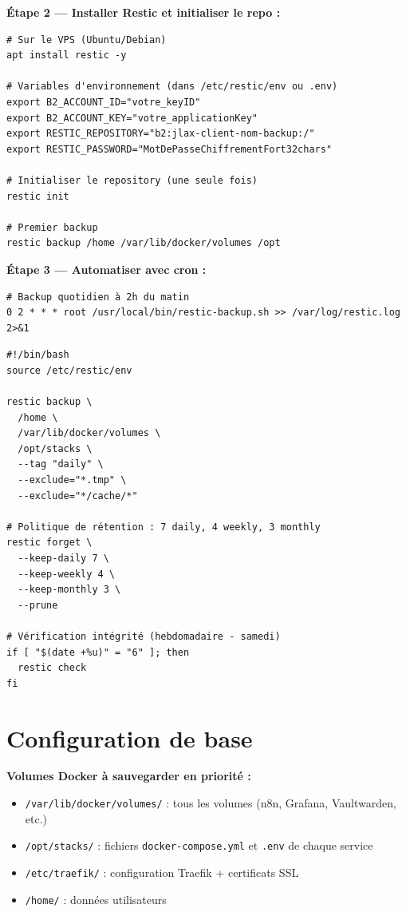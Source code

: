 \documentclass[11pt, a4paper]{article}
\begin{document}
\textbf{Étape 2 — Installer Restic et initialiser le repo :}
\begin{lstlisting}[style=terminal, caption={Installation et initialisation}]
# Sur le VPS (Ubuntu/Debian)
apt install restic -y

# Variables d'environnement (dans /etc/restic/env ou .env)
export B2_ACCOUNT_ID="votre_keyID"
export B2_ACCOUNT_KEY="votre_applicationKey"
export RESTIC_REPOSITORY="b2:jlax-client-nom-backup:/"
export RESTIC_PASSWORD="MotDePasseChiffrementFort32chars"

# Initialiser le repository (une seule fois)
restic init

# Premier backup
restic backup /home /var/lib/docker/volumes /opt
\end{lstlisting}

\textbf{Étape 3 — Automatiser avec cron :}
\begin{lstlisting}[style=terminal, caption={/etc/cron.d/restic-backup}]
# Backup quotidien à 2h du matin
0 2 * * * root /usr/local/bin/restic-backup.sh >> /var/log/restic.log 2>&1
\end{lstlisting}

\begin{lstlisting}[style=terminal, caption={/usr/local/bin/restic-backup.sh}]
#!/bin/bash
source /etc/restic/env

restic backup \
  /home \
  /var/lib/docker/volumes \
  /opt/stacks \
  --tag "daily" \
  --exclude="*.tmp" \
  --exclude="*/cache/*"

# Politique de rétention : 7 daily, 4 weekly, 3 monthly
restic forget \
  --keep-daily 7 \
  --keep-weekly 4 \
  --keep-monthly 3 \
  --prune

# Vérification intégrité (hebdomadaire - samedi)
if [ "$(date +%u)" = "6" ]; then
  restic check
fi
\end{lstlisting}

\section{Configuration de base}

\textbf{Volumes Docker à sauvegarder en priorité :}
\begin{itemize}
  \item \texttt{/var/lib/docker/volumes/} : tous les volumes (n8n, Grafana, Vaultwarden, etc.)
  \item \texttt{/opt/stacks/} : fichiers \texttt{docker-compose.yml} et \texttt{.env} de chaque service
  \item \texttt{/etc/traefik/} : configuration Traefik + certificats SSL
  \item \texttt{/home/} : données utilisateurs
\end{itemize}
\end{document}
